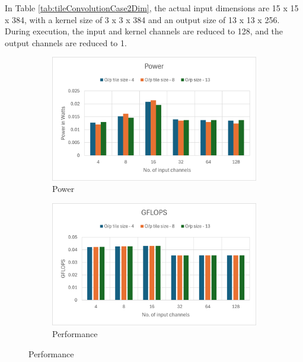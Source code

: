 In Table \ref{tab:tileConvolutionCase2Dim}, the actual input dimensions are 15 x 15 x 384, with a kernel size of 3 x 3 x 384 and an output size of 13 x 13 x 256. During execution, the input and kernel channels are reduced to 128, and the output channels are reduced to 1.
\\
\begin{figure}[h!]
    \centering

    \begin{subfigure}{0.45\textwidth}
   \centering
   \includegraphics[width=\linewidth]{figure/chapter4_results/figure 1 - power.png}
   \caption{Power}
   \label{fig:power}
    \end{subfigure}
    \hfill
    \begin{subfigure}{0.45\textwidth}
   \centering
   \includegraphics[width=\linewidth]{figure/chapter4_results/figure 2 - performance.png}
   \caption{Performance}
   \label{fig:performance}
    \end{subfigure}


\end{figure}
